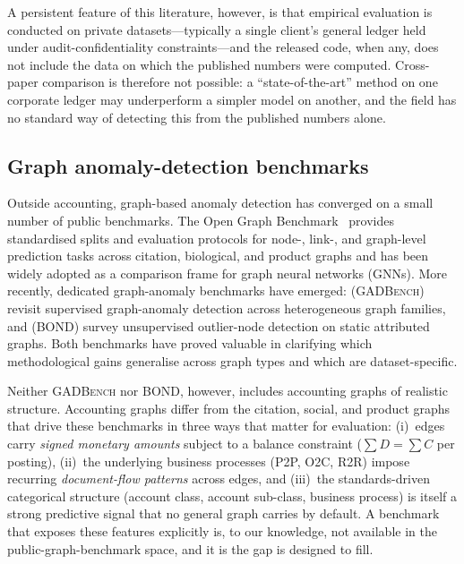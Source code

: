 A persistent feature of this literature, however, is that empirical
evaluation is conducted on private datasets---typically a single
client's general ledger held under audit-confidentiality
constraints---and the released code, when any, does not include the
data on which the published numbers were computed.  Cross-paper
comparison is therefore not possible: a ``state-of-the-art'' method
on one corporate ledger may underperform a simpler model on another,
and the field has no standard way of detecting this from the
published numbers alone.

\subsection{Graph anomaly-detection benchmarks}
\label{sec:related-work:graph-bench}

Outside accounting, graph-based anomaly detection has converged on a
small number of public benchmarks.  The Open Graph
Benchmark~\citep{hu2020ogb} provides standardised splits and
evaluation protocols for node-, link-, and graph-level prediction
tasks across citation, biological, and product graphs and has been
widely adopted as a comparison frame for graph neural networks
(GNNs).  More recently, dedicated graph-anomaly benchmarks have
emerged: \citet{liu2024gadbench} (\textsc{GADBench}) revisit
supervised graph-anomaly detection across heterogeneous graph
families, and \citet{tang2023bond} (\textsc{BOND}) survey unsupervised
outlier-node detection on static attributed graphs.  Both benchmarks
have proved valuable in clarifying which methodological gains
generalise across graph types and which are dataset-specific.

Neither \textsc{GADBench} nor \textsc{BOND}, however, includes
accounting graphs of realistic structure.  Accounting graphs differ
from the citation, social, and product graphs that drive these
benchmarks in three ways that matter for evaluation: (i)~edges carry
\emph{signed monetary amounts} subject to a balance constraint
($\sum D = \sum C$ per posting), (ii)~the underlying business
processes (P2P, O2C, R2R) impose recurring \emph{document-flow
patterns} across edges, and (iii)~the standards-driven categorical
structure (account class, account sub-class, business process) is
itself a strong predictive signal that no general graph carries by
default.  A benchmark that exposes these features explicitly is, to
our knowledge, not available in the public-graph-benchmark space, and
it is the gap \bench{} is designed to fill.


